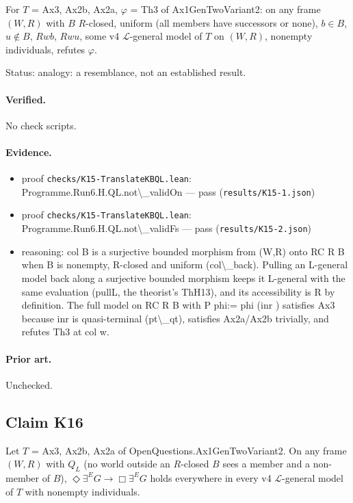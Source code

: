 \documentclass{article}
\begin{document}
For $T$ = Ax3, Ax2b, Ax2a, $\varphi$ = Th3 of Ax1GenTwoVariant2: on any frame $(W,R)$ with $B$ $R$-closed, uniform (all members have successors or none), $b\in B$, $u\notin B$, $Rwb$, $Rwu$, some v4 $\mathcal L$-general model of $T$ on $(W,R)$, nonempty individuals, refutes $\varphi$.

Status: analogy: a resemblance, not an established result.

\paragraph{Verified.}
No check scripts.

\paragraph{Evidence.}
\begin{itemize}
\item proof \texttt{checks/K15-TranslateKBQL.lean}: Programme.Run6.H.QL.not\textbackslash{}\_validOn --- pass (\texttt{results/K15-1.json})
\item proof \texttt{checks/K15-TranslateKBQL.lean}: Programme.Run6.H.QL.not\textbackslash{}\_validFs --- pass (\texttt{results/K15-2.json})
\item reasoning: col B is a surjective bounded morphism from (W,R) onto RC R B when B is nonempty, R-closed and uniform (col\textbackslash{}\_back). Pulling an L-general model back along a surjective bounded morphism keeps it L-general with the same evaluation (pullL, the theorist's ThH13), and its accessibility is R by definition. The full model on RC R B with P phi:= phi (inr ) satisfies Ax3 because inr is quasi-terminal (pt\textbackslash{}\_qt), satisfies Ax2a/Ax2b trivially, and refutes Th3 at col w.
\end{itemize}

\paragraph{Prior art.} Unchecked.

\subsection*{Claim K16}

Let $T$ = Ax3, Ax2b, Ax2a of OpenQuestions.Ax1GenTwoVariant2. On any frame $(W,R)$ with $Q_L$ (no world outside an $R$-closed $B$ sees a member and a non-member of $B$), $\Diamond\exists^E G\to\Box\exists^E G$ holds everywhere in every v4 $\mathcal L$-general model of $T$ with nonempty individuals.
\end{document}
